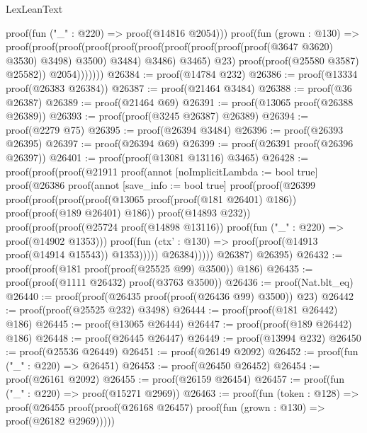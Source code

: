 \begin{lexlean}{LexLeanText}
\begin{coremodule}
                      proof(fun ("_" : @220) => proof(@14816 @2054)))
                    proof(fun (grown : @130) =>
                      proof(proof(proof(proof(proof(proof(proof(proof(proof(proof(@3647 @3620)
                                          @3530)
                                        @3498)
                                      @3500)
                                    @3484)
                                  @3486)
                                @3465)
                              @23)
                            proof(proof(@25580 @3587) @25582))
                          @2054)))))))
@26384 := proof(@14784 @232)
@26386 := proof(@13334 proof(@26383 @26384))
@26387 := proof(@21464 @3484)
@26388 := proof(@36 @26387)
@26389 := proof(@21464 @69)
@26391 := proof(@13065 proof(@26388 @26389))
@26393 := proof(proof(@3245 @26387) @26389)
@26394 := proof(@2279 @75)
@26395 := proof(@26394 @3484)
@26396 := proof(@26393 @26395)
@26397 := proof(@26394 @69)
@26399 := proof(@26391 proof(@26396 @26397))
@26401 := proof(proof(@13081 @13116) @3465)
@26428 := proof(proof(proof(@21911
          proof(annot [noImplicitLambda := bool true]
            proof(@26386
                proof(annot [save_info := bool true]
                  proof(proof(@26399
                        proof(proof(proof(proof(@13065 proof(proof(@181 @26401) @186))
                                proof(proof(@189 @26401) @186))
                              proof(@14893 @232))
                            proof(proof(proof(@25724 proof(@14898 @13116))
                                  proof(fun ("_" : @220) => proof(@14902 @1353)))
                                proof(fun (ctx' : @130) =>
                                  proof(proof(@14913 proof(@14914 @15543)) @1353)))))
                      @26384)))))
        @26387)
      @26395)
@26432 := proof(proof(@181 proof(proof(@25525 @99) @3500)) @186)
@26435 := proof(proof(@1111 @26432) proof(@3763 @3500))
@26436 := proof(Nat.blt_eq)
@26440 := proof(proof(@26435 proof(proof(@26436 @99) @3500)) @23)
@26442 := proof(proof(@25525 @232) @3498)
@26444 := proof(proof(@181 @26442) @186)
@26445 := proof(@13065 @26444)
@26447 := proof(proof(@189 @26442) @186)
@26448 := proof(@26445 @26447)
@26449 := proof(@13994 @232)
@26450 := proof(@25536 @26449)
@26451 := proof(@26149 @2092)
@26452 := proof(fun ("_" : @220) => @26451)
@26453 := proof(@26450 @26452)
@26454 := proof(@26161 @2092)
@26455 := proof(@26159 @26454)
@26457 := proof(fun ("_" : @220) => proof(@15271 @2969))
@26463 := proof(fun (token : @128) =>
    proof(@26455 proof(proof(@26168 @26457) proof(fun (grown : @130) => proof(@26182 @2969)))))

\end{coremodule}
\end{lexlean}
